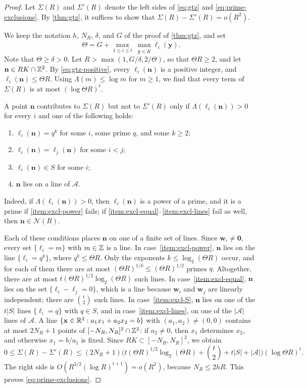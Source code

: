 \begin{proof}
Let $\Sigma(R)$ and $\Sigma'(R)$ denote the left sides of \eqref{eq:gtz} and \eqref{eq:prime-exclusions}. By \cref{thm:gtz}, it suffices to show that $\Sigma(R)-\Sigma'(R)=o(R^2)$.

We keep the notation $h$, $N_R$, $\delta$, and $G$ of the proof of \cref{thm:gtz}, and set
\[
\Theta=G+\max_{1\le i\le t}\ \max_{\mathbf y\in\overline K}\dot\ell_i(\mathbf y).
\]
Note that $\Theta\ge\delta>0$. Let $R>\max(1,G/\delta,2/\Theta)$, so that $\Theta R\ge2$, and let $\mathbf n\in RK\cap\mathbb Z^2$. By \eqref{eq:gtz-positive}, every $\ell_i(\mathbf n)$ is a positive integer, and $\ell_i(\mathbf n)\le\Theta R$. Using $\Lambda(m)\le\log m$ for $m\ge1$, we find that every term of $\Sigma(R)$ is at most $(\log\Theta R)^t$.

A point $\mathbf n$ contributes to $\Sigma(R)$ but not to $\Sigma'(R)$ only if $\Lambda(\ell_i(\mathbf n))>0$ for every $i$ and one of the following holds:
\begin{enumerate}[label=(\roman*)]
\item\label{item:excl-power} $\ell_i(\mathbf n)=q^k$ for some $i$, some prime $q$, and some $k\ge2$;
\item\label{item:excl-equal} $\ell_i(\mathbf n)=\ell_j(\mathbf n)$ for some $i<j$;
\item\label{item:excl-S} $\ell_i(\mathbf n)\in S$ for some $i$;
\item\label{item:excl-lines} $\mathbf n$ lies on a line of $\mathcal A$.
\end{enumerate}
Indeed, if $\Lambda(\ell_i(\mathbf n))>0$, then $\ell_i(\mathbf n)$ is a power of a prime, and it is a prime if \ref{item:excl-power} fails; if \ref{item:excl-equal}--\ref{item:excl-lines} fail as well, then $\mathbf n\in\mathcal N(R)$.

Each of these conditions places $\mathbf n$ on one of a finite set of lines. Since $\mathbf w_i\ne\mathbf 0$, every set $\{\ell_i=m\}$ with $m\in\mathbb Z$ is a line. In case~\ref{item:excl-power}, $\mathbf n$ lies on the line $\{\ell_i=q^k\}$, where $q^k\le\Theta R$. Only the exponents $k\le\log_2(\Theta R)$ occur, and for each of them there are at most $(\Theta R)^{1/k}\le(\Theta R)^{1/2}$ primes $q$. Altogether, there are at most $t(\Theta R)^{1/2}\log_2(\Theta R)$ such lines. In case~\ref{item:excl-equal}, $\mathbf n$ lies on the set $\{\ell_i-\ell_j=0\}$, which is a line because $\mathbf w_i$ and $\mathbf w_j$ are linearly independent; there are $\binom t2$ such lines. In case~\ref{item:excl-S}, $\mathbf n$ lies on one of the $t|S|$ lines $\{\ell_i=q\}$ with $q\in S$, and in case~\ref{item:excl-lines}, on one of the $|\mathcal A|$ lines of $\mathcal A$. A line $\{\mathbf x\in\mathbb R^2:a_1x_1+a_2x_2=b\}$ with $(a_1,a_2)\ne(0,0)$ contains at most $2N_R+1$ points of $[-N_R,N_R]^2\cap\mathbb Z^2$: if $a_2\ne0$, then $x_1$ determines $x_2$, and otherwise $x_1=b/a_1$ is fixed. Since $RK\subset[-N_R,N_R]^2$, we obtain
\[
0\le\Sigma(R)-\Sigma'(R)\le(2N_R+1)\Big(t(\Theta R)^{1/2}\log_2(\Theta R)+\binom t2+t|S|+|\mathcal A|\Big)(\log\Theta R)^t.
\]
The right side is $O(R^{3/2}(\log R)^{t+1})=o(R^2)$, because $N_R\le2hR$. This proves \eqref{eq:prime-exclusions}.


\end{proof}
